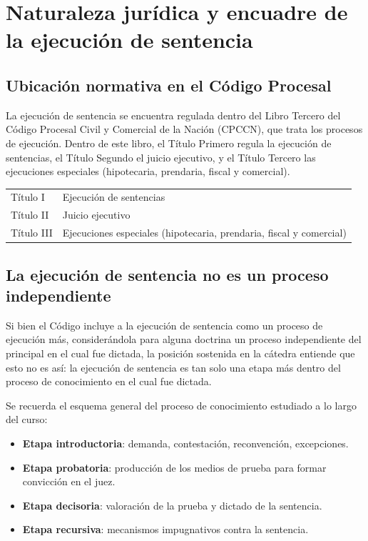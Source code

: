 \documentclass[12pt,oneside]{book}
\begin{document}
\section{Naturaleza jur\'idica y encuadre de la ejecuci\'on de sentencia}

\subsection{Ubicaci\'on normativa en el C\'odigo Procesal}

La ejecuci\'on de sentencia se encuentra regulada dentro del Libro Tercero del C\'odigo Procesal Civil y Comercial de la Naci\'on (CPCCN), que trata los procesos de ejecuci\'on. Dentro de este libro, el T\'itulo Primero regula la ejecuci\'on de sentencias, el T\'itulo Segundo el juicio ejecutivo, y el T\'itulo Tercero las ejecuciones especiales (hipotecaria, prendaria, fiscal y comercial).

\begin{table}[H]
\centering
\begin{tabularx}{\textwidth}{>{\raggedright\arraybackslash}p{} X}
\toprule
\multicolumn{2}{l}{\textbf{Libro III del CPCCN}} \\
\midrule
T\'itulo I & Ejecuci\'on de sentencias \\
T\'itulo II & Juicio ejecutivo \\
T\'itulo III & Ejecuciones especiales (hipotecaria, prendaria, fiscal y comercial) \\
\bottomrule
\end{tabularx}
\end{table}

\subsection{La ejecuci\'on de sentencia no es un proceso independiente}

Si bien el C\'odigo incluye a la ejecuci\'on de sentencia como un proceso de ejecuci\'on m\'as, consider\'andola para alguna doctrina un proceso independiente del principal en el cual fue dictada, la posici\'on sostenida en la c\'atedra entiende que esto no es as\'i: la ejecuci\'on de sentencia es tan solo una etapa m\'as dentro del proceso de conocimiento en el cual fue dictada.

Se recuerda el esquema general del proceso de conocimiento estudiado a lo largo del curso:

\begin{itemize}
    \item \textbf{Etapa introductoria}: demanda, contestaci\'on, reconvenci\'on, excepciones.
    \item \textbf{Etapa probatoria}: producci\'on de los medios de prueba para formar convicci\'on en el juez.
    \item \textbf{Etapa decisoria}: valoraci\'on de la prueba y dictado de la sentencia.
    \item \textbf{Etapa recursiva}: mecanismos impugnativos contra la sentencia.
\end{itemize}
\end{document}
